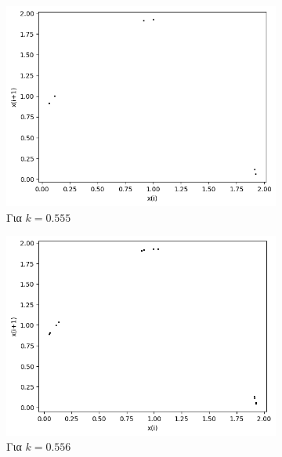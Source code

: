 \begin{figure}[ht]
	\centering
	
	\begin{subfigure}[b]{0.4\textwidth}
		\centering
		\includegraphics[width=\textwidth]{LateX images/graphs q03/g9}
		\caption{Για $k=0.555$}
		\label{f:k21}
	\end{subfigure}
	\hfill
	\begin{subfigure}[b]{0.4\textwidth}
		\centering
		\includegraphics[width=\textwidth]{LateX images/graphs q03/g10}
		\caption{Για $k=0.556$}
		\label{f:k22}
	\end{subfigure}
	\hfill
	\begin{subfigure}[b]{0.4\textwidth}
		\centering

\end{subfigure}
\end{figure}

